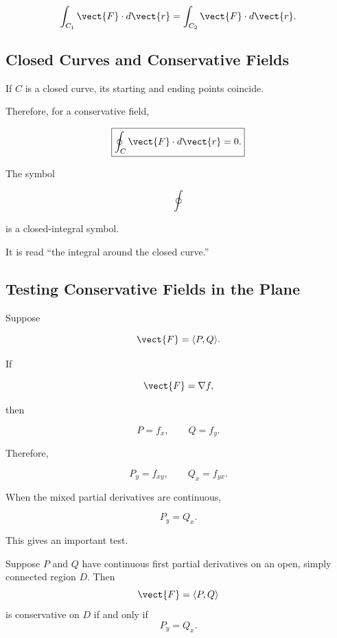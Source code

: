 \[ \int_{C_1}\vect{F}\cdot d\vect{r}
=\int_{C_2}\vect{F}\cdot d\vect{r}. \]

\subsection{Closed Curves and Conservative Fields}
\label{subsec:closed-curves-conservative}

If \(C\) is a closed curve, its starting and ending points coincide.

Therefore, for a conservative field,

\[ \boxed{\oint_C\vect{F}\cdot d\vect{r}=0.} \]

The symbol

\[ \oint \]

is a closed-integral symbol.

It is read ``the integral around the closed curve.''

\subsection{Testing Conservative Fields in the Plane}
\label{subsec:testing-conservative-plane}

Suppose

\[ \vect{F}=\langle P,Q\rangle. \]

If

\[ \vect{F}=\nabla f, \]

then

\[ P=f_x,\qquad Q=f_y. \]

Therefore,

\[ P_y=f_{xy},\qquad Q_x=f_{yx}. \]

When the mixed partial derivatives are continuous,

\[ P_y=Q_x. \]

This gives an important test.

\begin{theorem}
Suppose \(P\) and \(Q\) have continuous first partial derivatives on an open,
simply connected region \(D\). Then
\[ \vect{F}=\langle P,Q\rangle \]
is conservative on \(D\) if and only if
\[ \boxed{P_y=Q_x.} \]
\end{theorem}

